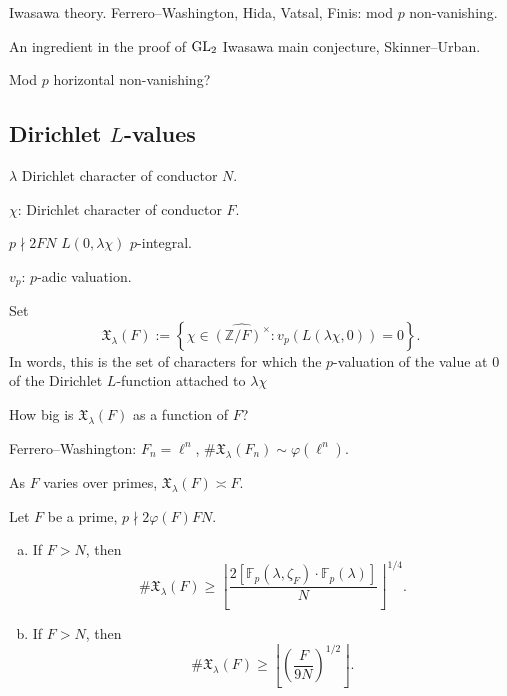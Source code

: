 \documentclass[reqno]{amsart} 
\begin{document}
Iwasawa theory.  Ferrero--Washington, Hida, Vatsal, Finis: mod $p$ non-vanishing.

An ingredient in the proof of $\operatorname{GL}_2$ Iwasawa main conjecture, Skinner--Urban.

Mod $p$ horizontal non-vanishing?

\subsection{Dirichlet $L$-values}
$\lambda$ Dirichlet character of conductor $N$.

$\chi$: Dirichlet character of conductor $F$.

$p \nmid 2 F N$ $L(0, \lambda \chi)$ $p$-integral.

$v_p$: $p$-adic valuation.

Set
\begin{equation*}
\mathfrak{X}_\lambda(F) := \left\{ \chi \in \widehat{(\mathbb{Z} / F)^\times } : v_p \left( L(\lambda \chi, 0) \right) = 0 \right\}.
\end{equation*}
In words, this is the set of characters for which the $p$-valuation of the value at $0$ of the Dirichlet $L$-function attached to $\lambda \chi$

\begin{question}
  How big is $\mathfrak{X}_\lambda(F) $ as a function of $F$?
\end{question}

Ferrero--Washington: $F_n = \ell^n$, $\# \mathfrak{X}_\lambda(F_n) \sim \varphi(\ell^n)$.

As $F$ varies over primes, $\mathfrak{X}_\lambda(F) \asymp F$.

\begin{theorem}[Sun--B]
  Let $F$ be a prime, $p \nmid 2 \varphi(F) F N$.
  \begin{enumerate}[(a)]
  \item\label{enumerate:cnekzumaui} If $F > N$, then
    \begin{equation*}
      \# \mathfrak{X}_\lambda(F) \geq
      \left\lfloor
        \frac{2 [\mathbb{F}_p(\lambda, \zeta_F ) \cdot \mathbb{F}_p(\lambda) ]}{N}
      \right\rfloor^{1/4}.
    \end{equation*}
  \item\label{enumerate:cnekzumb90} If $F > N$, then
    \begin{equation*}
      \# \mathfrak{X}_\lambda(F) \geq
      \left\lfloor
        \left( \frac{F}{9 N} \right)^{1/2}
      \right\rfloor.
    \end{equation*}
  \end{enumerate}
\end{theorem}
\end{document}
